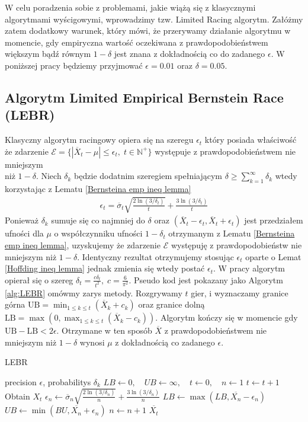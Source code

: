\documentclass[inzynierska]{pwr_wmat_praca_dyplomowa}
\theoremstyle{plain}
\numberwithin{theorem}{chapter}
\theoremstyle{definition}
\numberwithin{theorem}{chapter}
\begin{document}
	W celu poradzenia sobie z problemami, jakie wiążą się z klasycznymi algorytmami wyścigowymi, wprowadzimy  tzw. Limited Racing algorytm. Załóżmy zatem dodatkowy warunek, który mówi, że przerywamy działanie algorytmu w momencie, gdy empiryczna wartość oczekiwana z prawdopodobieństwem większym bądź równym $1-\delta$ jest znana z dokładnością co do zadanego $\epsilon$. W poniższej pracy będziemy przyjmować $\epsilon=0.01$ oraz $\delta = 0.05$.
	\subsection{Algorytm Limited Empirical Bernstein Race (LEBR)}
	Klasyczny algorytm racingowy opiera się na szeregu $\epsilon_t$ który posiada właściwość że zdarzenie $\mathcal{E}= \{|\overline{X}_t - \mu | \le \epsilon_t,\; t\in \mathbb{N}^+\}$ występuje z prawdopodobieństwem nie mniejszym 
	\\niż $1-\delta$. Niech $\delta_k$ będzie dodatnim szeregiem spełniającym $ \delta \ge \sum_{k = 1}^{\infty}\delta_k$ wtedy korzystając z Lematu \ref{Bernsteina emp ineq lemma}
	\begin{gather*}
		\label{eq:LEBR epsilon}
		\epsilon_t =  \overline{\sigma}_t \sqrt{\frac{2\ln(3/\delta_t)}{t}} + \frac{3  \ln{(3 / \delta_t)}}{t}
	\end{gather*}
	Ponieważ $\delta_k$ sumuje się co najmniej do $\delta$ oraz $(\overline{X}_t - \epsilon_t, \overline{X}_t + \epsilon_t)$ jest przedziałem ufności dla $\mu$ o współczynniku ufności $1-\delta_t$ 
	otrzymanym z Lematu \ref{Bernsteina emp ineq lemma}, uzyskujemy że zdarzenie $\mathcal{E}$ występuję z prawdopodobieństw nie mniejszym niż $1-\delta$. Identyczny rezultat otrzymujemy stosując $\epsilon_t$ oparte o Lemat \ref{Hoffding ineq lemma} jednak zmienia się wtedy postać $\epsilon_t$. W pracy \cite{cauwet2018surprising} algorytm opierał się o szereg $\delta_t=\frac{c\delta_t}{t^2},\; c=\frac{6}{\pi^2}$.
	Pseudo kod jest pokazany jako Algorytm \ref{alg:LEBR} omówmy zarys metody. Rozgrywamy $t$ gier, i wyznaczamy granice górna $\text{UB} = \displaystyle\min_{1\le k\le t}( \overline{X}_k+c_k)$  oraz granice dolną $\text{LB} = \max(0,\displaystyle\max_{1\le k\le t}(\overline{X}_k-c_k))$. Algorytm kończy się w momencie gdy $\text{UB}-\text{LB}< 2\epsilon$. Otrzymane w ten sposób $\overline{X}$ z prawdopodobieństwem nie mniejszym niż $1 - \delta$ wynosi $\mu$ z dokładnością co zadanego $\epsilon$. 
	\begin{algorithm}[H]
		\caption{LEBR}\label{alg:LEBR}
		\begin{algorithmic}
			\Ensure precision $\epsilon$, probabilitys $\delta_k$
			\State $LB \gets 0, \quad UB \gets \infty, \quad t \gets 0,\quad n \gets 1$ 
			\State $t \gets t + 1$
			\State Obtain $X_t$				
			\State $\epsilon_n \gets \overline{\sigma}_n \sqrt{\frac{2\ln(3/\delta_n)}{n}} + \frac{3  \ln{(3 / \delta_n)}}{n}$ 
			\State $LB \gets \max(LB,  \overline{X_n} - \epsilon_n)$
			\State $UB \gets \min(BU,  \overline{X_n} + \epsilon_n)$
			\State $n \gets n + 1$
			\EndWhile
			\State \Return $ \overline{X_t}$		
		\end{algorithmic}
	\end{algorithm}
\end{document}
